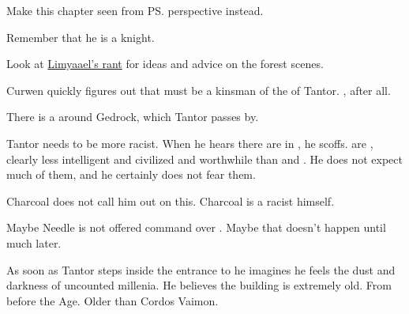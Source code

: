\begin{garbage}
\begin{changes}
\begin{comment}
  \paragraph{For War and For Glory}
  \end{comment}
    Make this chapter seen from \ps{\Sethgal} perspective instead. 
    
    Remember that he is a knight. 
  
  \begin{comment}\paragraph{The Mystery of \EreshKal}\end{comment}
    Look at \href{http://limyaael.livejournal.com/167123.html}{Limyaael's  rant} for ideas and advice on the forest scenes. 
    
    Curwen quickly figures out that  must be a kinsman of the \scarv{} of Tantor. 
    , after all.
    
    There is a  around Gedrock, which Tantor passes by. 
    
    Tantor needs to be more racist. 
    When he hears there are \meccara{} in \EreshKal, he scoffs. 
    \Meccara{} are , clearly less intelligent and civilized and worthwhile than \humans{} and \scathae. 
    He does not expect much of them, and he certainly does not fear them. 
    
    Charcoal does not call him out on this. 
    Charcoal is a racist himself. 
  
  \begin{comment}\paragraph{A Dark Angel's Gift}\end{comment}
    Maybe Needle is not offered command over \banes. 
    Maybe that doesn't happen until much later. 
  
  \begin{comment}\paragraph{The Gods of \EreshKal}\end{comment}
    As soon as Tantor steps inside the entrance to \EreshKal{} he imagines he feels the dust and darkness of uncounted millenia. 
    He believes the building is extremely old. 
    From before the \Human{} Age. 
    Older than Cordos Vaimon. 
    

\end{changes}
\end{garbage}
